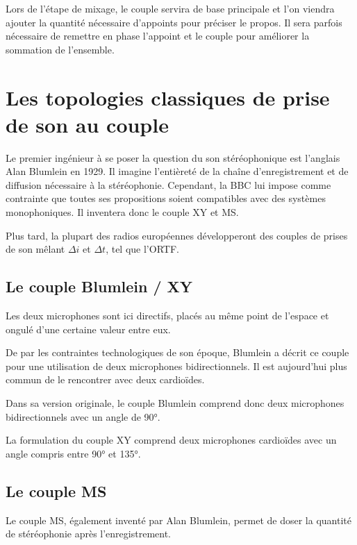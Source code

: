 \documentclass[
]{book}
\begin{document}
Lors de l'étape de mixage, le couple servira de base principale et l'on viendra ajouter la quantité nécessaire d'appoints pour préciser le propos. Il sera parfois nécessaire de remettre en phase l'appoint et le couple pour améliorer la sommation de l'ensemble.

\hypertarget{les-topologies-classiques-de-prise-de-son-au-couple}{%
\section{Les topologies classiques de prise de son au couple}\label{les-topologies-classiques-de-prise-de-son-au-couple}}

Le premier ingénieur à se poser la question du son stéréophonique est l'anglais Alan Blumlein en 1929. Il imagine l'entièreté de la chaîne d'enregistrement et de diffusion nécessaire à la stéréophonie. Cependant, la BBC lui impose comme contrainte que toutes ses propositions soient compatibles avec des systèmes monophoniques. Il inventera donc le couple XY et MS.

Plus tard, la plupart des radios européennes développeront des couples de prises de son mêlant \(\Delta i\) et \(\Delta t\), tel que l'ORTF.

\hypertarget{le-couple-blumlein-xy}{%
\subsection{Le couple Blumlein / XY}\label{le-couple-blumlein-xy}}

Les deux microphones sont ici directifs, placés au même point de l'espace et ongulé d'une certaine valeur entre eux.

De par les contraintes technologiques de son époque, Blumlein a décrit ce couple pour une utilisation de deux microphones bidirectionnels. Il est aujourd'hui plus commun de le rencontrer avec deux cardioïdes.

Dans sa version originale, le couple Blumlein comprend donc deux microphones bidirectionnels avec un angle de 90°.

La formulation du couple XY comprend deux microphones cardioïdes avec un angle compris entre 90° et 135°.

\hypertarget{le-couple-ms}{%
\subsection{Le couple MS}\label{le-couple-ms}}

Le couple MS, également inventé par Alan Blumlein, permet de doser la quantité de stéréophonie après l'enregistrement.
\end{document}
